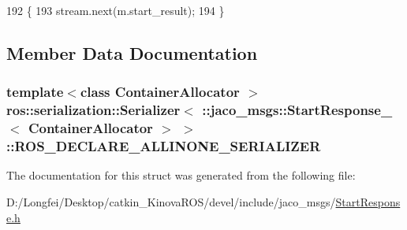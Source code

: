 \begin{DoxyCode}
192     \{
193       stream.next(m.start\_result);
194     \}
\end{DoxyCode}


\subsection{Member Data Documentation}
\subsubsection[{\texorpdfstring{R\+O\+S\+\_\+\+D\+E\+C\+L\+A\+R\+E\+\_\+\+A\+L\+L\+I\+N\+O\+N\+E\+\_\+\+S\+E\+R\+I\+A\+L\+I\+Z\+ER}{ROS_DECLARE_ALLINONE_SERIALIZER}}]{\setlength{\rightskip}{0pt plus 5cm}template$<$class Container\+Allocator $>$ ros\+::serialization\+::\+Serializer$<$ \+::{\bf jaco\+\_\+msgs\+::\+Start\+Response\+\_\+}$<$ Container\+Allocator $>$ $>$\+::R\+O\+S\+\_\+\+D\+E\+C\+L\+A\+R\+E\+\_\+\+A\+L\+L\+I\+N\+O\+N\+E\+\_\+\+S\+E\+R\+I\+A\+L\+I\+Z\+ER}\hypertarget{structros_1_1serialization_1_1Serializer_3_01_1_1jaco__msgs_1_1StartResponse___3_01ContainerAllocator_01_4_01_4_a99be9174843add207b65a9f6c8387d92}{}\label{structros_1_1serialization_1_1Serializer_3_01_1_1jaco__msgs_1_1StartResponse___3_01ContainerAllocator_01_4_01_4_a99be9174843add207b65a9f6c8387d92}


The documentation for this struct was generated from the following file\+:\begin{DoxyCompactItemize}
\item 
D\+:/\+Longfei/\+Desktop/catkin\+\_\+\+Kinova\+R\+O\+S/devel/include/jaco\+\_\+msgs/\hyperlink{StartResponse_8h}{Start\+Response.\+h}\end{DoxyCompactItemize}
